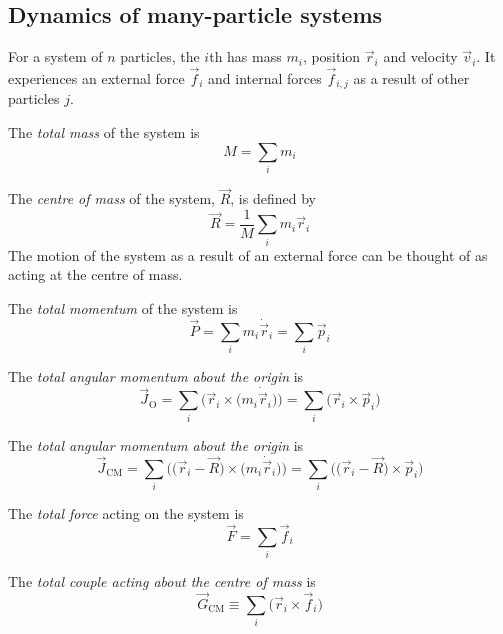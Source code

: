 \documentclass[a4paper]{article}
\begin{document}
\subsection{Dynamics of many-particle systems}
For a system of $n$ particles, the $i$th has mass $m_i$, position $\vec{r}_i$ and velocity $\vec{v}_i$. It experiences an external force $\vec{f}_{i}$ and internal forces $\vec{f}_{i,j}$ as a result of other particles $j$.

\begin{defi}
  The \emph{total mass} of the system is $$M = \sum_i m_i$$
\end{defi}

\begin{defi}
  The \emph{centre of mass} of the system, $\vec{R}$, is defined by $$\vec{R} = \frac{1}{M}\sum_im_i\vec{r}_i$$ The motion of the system as a result of an external force can be thought of as acting at the centre of mass.
\end{defi}

\begin{defi}
  The \emph{total momentum} of the system is $$\vec{P} = \sum_i m_i \dot{\vec{r}}_i = \sum_i \vec{p}_i$$ 
\end{defi}

\begin{defi}
  The \emph{total angular momentum about the origin} is $$ \vec{J}_{\textrm{O}} = \sum_i \big(\vec{r}_i\times\big(m_i\dot{\vec{r}}_i\big)\big) = \sum_i \big(\vec{r}_i\times \vec{p}_i \big)$$
\end{defi}

\begin{defi}
  The \emph{total angular momentum about the origin} is $$\vec{J}_{\textrm{CM}} = \sum_i \big( \big(\vec{r}_i - \vec{R} \big) \times \big(m_i \dot{\vec{r}}_i\big) \big) = \sum_i \big( \big(\vec{r}_i - \vec{R} \big) \times \vec{p}_i \big)$$
\end{defi}

\begin{defi}
  The \emph{total force} acting on the system is $$\vec{F} = \sum_i \vec{f}_i$$
\end{defi}

\begin{defi}
  The \emph{total couple acting about the centre of mass} is $$\vec{G}_{\textrm{CM}}\equiv \sum_i \big(\vec{r}_i \times \vec{f}_i\big)$$
\end{defi}
\end{document}
